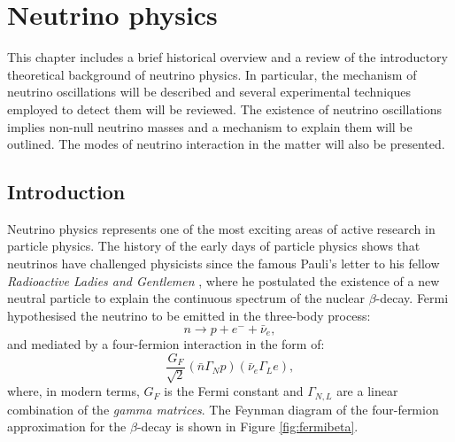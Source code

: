 \chapter{\label{ch:2-neutrinophysics}Neutrino physics}

\minitoc

This chapter includes a brief historical overview and a review of the introductory theoretical background of neutrino physics. In particular, the mechanism of neutrino oscillations will be described and several experimental techniques employed to detect them will be reviewed. The existence of neutrino oscillations implies non-null neutrino masses and a mechanism to explain them will be outlined. The modes of neutrino interaction in the matter will also be presented.%

\section{Introduction}

Neutrino physics represents one of the most exciting areas of active research in particle physics. The history of the early days of particle physics shows that neutrinos have challenged physicists since the famous Pauli's letter to his fellow \emph{Radioactive Ladies and Gentlemen} \cite{Pauli:1930pc}, where he postulated the existence of a new neutral particle to explain the continuous spectrum of the nuclear $\beta$-decay.  Fermi hypothesised the neutrino to be emitted in the three-body process:
\begin{equation}
    n\rightarrow p + e^{-} + \bar{\nu}_{e},
\end{equation}
and mediated by a four-fermion interaction in the form of:
\begin{equation}
    \frac{G_{F}}{\sqrt{2}}(\bar{n}\Gamma_{N}p)(\bar{\nu}_{e}\Gamma_{L}e),
\end{equation}
where, in modern terms, $G_{F}$ is the Fermi constant and $\Gamma_{N,L}$ are a linear combination of the \emph{gamma matrices}. The Feynman diagram of the four-fermion approximation for the $\beta$-decay is shown in Figure \ref{fig:fermibeta}.


